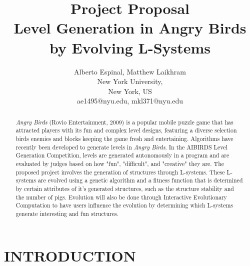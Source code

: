 \documentclass[letterpaper, 10 pt, conference]{ieeeconf}
\title{\LARGE \bf
Project Proposal\\
Level Generation in Angry Birds by Evolving L-Systems
}
\author{Alberto Espinal, Matthew Laikhram\\
New York University,\\
New York, US\\
ae1495@nyu.edu, mkl371@nyu.edu
}
\begin{document}
\maketitle
\thispagestyle{empty}
\pagestyle{empty}


\begin{abstract}
\textit{Angry Birds} (Rovio Entertainment, 2009) is a popular mobile puzzle game that has attracted players with its fun and complex level designs, featuring a diverse selection birds enemies and blocks keeping the game fresh and entertaining. Algorithms have recently been developed to generate levels in \textit{Angry Birds}. In the AIBIRDS Level Generation Competition, levels are generated autonomously in a program and are evaluated by judges based on how "fun", "difficult", and "creative" they are. The proposed project involves the generation of structures through L-systems. These L-systems are evolved using a genetic algorithm and a fitness function that is determined by certain attributes of it's generated structures, such as the structure stability and the number of pigs. Evolution will also be done through Interactive Evolutionary Computation to have users influence the evolution by determining which L-systems generate interesting and fun structures.

\end{abstract}


\section{INTRODUCTION}
\end{document}
